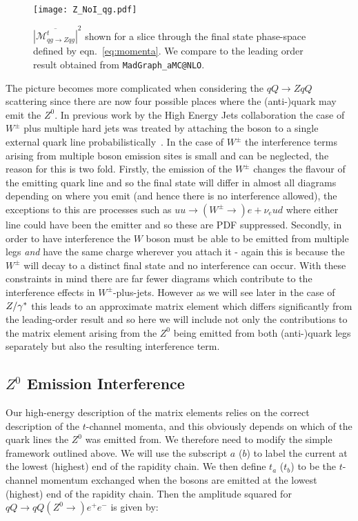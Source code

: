 		\begin{figure}[hbt]
			\centering
			\texttt{[image: Z\_NoI\_qg.pdf]}
			\caption{$\overline{|\mathcal{M}_{qg\to Zqg}^{t}|}^2$ shown for a slice through the
			final state phase-space defined by eqn.~\eqref{eq:momenta}.  We compare to the
			leading order result obtained from \texttt{MadGraph\_aMC@NLO}.}
			\label{fig:ZatLO}
		\end{figure}

		The picture becomes more complicated when considering the $qQ\to ZqQ$ scattering since
		there are now four possible places where the (anti-)quark may emit the $Z^0$.  In
		previous work by the High Energy Jets collaboration the case of $W^\pm$ plus multiple
		hard jets was treated by attaching the boson to a single external quark line
		probabilistically~\cite{Andersen:2012gk}.  In the case of $W^\pm$ the interference
		terms arising from multiple boson emission sites is small and can be neglected, the reason for this is two
		fold. Firstly, the emission of the $W^\pm$ changes the flavour of the emitting quark line and so the
		final state will differ in almost all diagrams depending on where you emit (and hence there is no
		interference allowed), the exceptions to this are processes such as $uu\to(W^\pm\to)e+\nu_eud$ where
		either line could have been the emitter and so these are PDF suppressed. Secondly, in order to have
		interference the $W$ boson must be able to be emitted from multiple legs \emph{and} have the same charge
		wherever you attach it - again this is because the $W^\pm$ will decay to a distinct final state and no
		interference can occur. With these constraints in mind there are far fewer diagrams which contribute to the
		interference effects in $W^\pm$-plus-jets.  However as we will see later in the case of $Z/\gamma^*$ this leads to an approximate matrix
		element which differs significantly from the leading-order result and so here we will include not only the
		contributions to the matrix element arising from the $Z^0$ being emitted from both (anti-)quark
		legs separately but also the resulting interference term.

	\subsection{$Z^0$ Emission Interference}

		Our high-energy
		description of the matrix elements relies on the correct description of the
		$t$-channel momenta, and this obviously depends on which of the quark lines
		the $Z^0$ was emitted from.  We therefore need to modify the simple
		framework outlined above.  We will use the subscript $a$ ($b$) to label the
		current at the lowest (highest) end of the rapidity chain.  We then define $t_a$
		($t_b$) to be the $t$-channel momentum exchanged when the bosons are emitted at
		the lowest (highest) end of the rapidity chain.  Then the amplitude squared
		for $qQ\to qQ(Z^0\to) e^+ e^-$ is given by:

